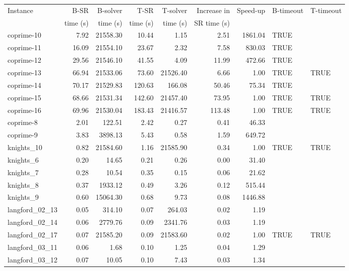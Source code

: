 \documentclass[runningheads]{llncs}
\begin{document}
\begin{table}[ht]
\centering
\begin{tabular}{lrrrrrrll}
  \hline
Instance & B-SR     & B-solver & T-SR      & T-solver  & Increase in & Speed-up & B-timeout & T-timeout \\
         & time (s) & time (s) & time (s)  & time (s)  & SR time (s)  & & & \\    
  \hline
coprime-10 & 7.92 & 21558.30 & 10.44 & 1.15 & 2.51 & 1861.04 & TRUE &   \\ 
coprime-11 & 16.09 & 21554.10 & 23.67 & 2.32 & 7.58 & 830.03 & TRUE &   \\ 
coprime-12 & 29.56 & 21546.10 & 41.55 & 4.09 & 11.99 & 472.66 & TRUE &   \\ 
coprime-13 & 66.94 & 21533.06 & 73.60 & 21526.40 & 6.66 & 1.00 & TRUE & TRUE \\ 
coprime-14 & 70.17 & 21529.83 & 120.63 & 166.08 & 50.46 & 75.34 & TRUE &   \\ 
coprime-15 & 68.66 & 21531.34 & 142.60 & 21457.40 & 73.95 & 1.00 & TRUE & TRUE \\ 
coprime-16 & 69.96 & 21530.04 & 183.43 & 21416.57 & 113.48 & 1.00 & TRUE & TRUE \\ 
coprime-8 & 2.01 & 122.51 & 2.42 & 0.27 & 0.41 & 46.33 &   &   \\ 
coprime-9 & 3.83 & 3898.13 & 5.43 & 0.58 & 1.59 & 649.72 &   &   \\ 
 knights\_10 & 0.82 & 21584.60 & 1.16 & 21585.90 & 0.34 & 1.00 & TRUE & TRUE \\ 
 knights\_6 & 0.20 & 14.65 & 0.21 & 0.26 & 0.00 & 31.40 &   &   \\ 
 knights\_7 & 0.28 & 10.54 & 0.35 & 0.15 & 0.06 & 21.62 &   &   \\ 
 knights\_8 & 0.37 & 1933.12 & 0.49 & 3.26 & 0.12 & 515.44 &   &   \\ 
 knights\_9 & 0.60 & 15064.30 & 0.68 & 9.73 & 0.08 & 1446.88 &   &   \\ 
 langford\_02\_13 & 0.05 & 314.10 & 0.07 & 264.03 & 0.02 & 1.19 &   &   \\ 
 langford\_02\_14 & 0.06 & 2779.76 & 0.09 & 2341.76 & 0.03 & 1.19 &   &   \\ 
 langford\_02\_17 & 0.07 & 21585.20 & 0.09 & 21583.60 & 0.02 & 1.00 & TRUE & TRUE \\ 
 langford\_03\_11 & 0.06 & 1.68 & 0.10 & 1.25 & 0.04 & 1.29 &   &   \\ 
 langford\_03\_12 & 0.07 & 10.05 & 0.10 & 7.43 & 0.03 & 1.34 &   &   \\ 

\end{tabular}
\end{table}
\end{document}

